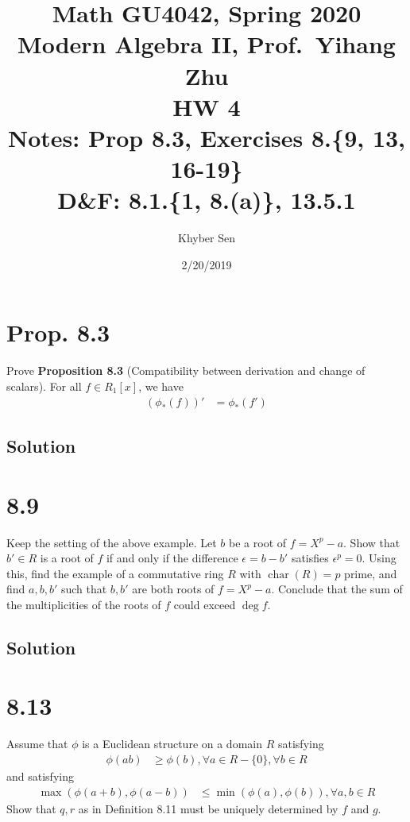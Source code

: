 \documentclass[fleqn]{article}
\title{
Math GU4042, Spring 2020 \\
Modern Algebra II, Prof.\ Yihang Zhu \\
HW 4 \\
Notes: Prop 8.3, Exercises 8.\{9, 13, 16-19\} \\
D\&F: 8.1.\{1, 8.(a)\}, 13.5.1
}
\author{Khyber Sen}
\date{2/20/2019}
\DeclareMathOperator{\Char}{char}
\begin{document}
    
    \maketitle
    
    \section{Prop. 8.3}
    Prove \textbf{Proposition 8.3} (Compatibility between derivation and change of scalars).  For all $f \in R_1[x]$, we have
    \begin{align}
        (\phi_*(f))' &= \phi_*(f')
    \end{align}
        
        \subsection{Solution}
        
    
    \section{8.9}
    Keep the setting of the above example.  Let $b$ be a root of $f = X^p - a$.  Show that $b' \in R$ is a root of $f$ if and only if the difference $\epsilon = b - b'$ satisfies $\epsilon^p = 0$.  Using this, find the example of a commutative ring $R$ with $\Char(R) = p$ prime, and find $a, b, b'$ such that $b, b'$ are both roots of $f = X^p - a$.  Conclude that the sum of the multiplicities of the roots of $f$ could exceed $\deg f$.
        
        \subsection{Solution}
        
    
    \section{8.13}
    Assume that $\phi$ is a Euclidean structure on a domain $R$ satisfying
    \begin{align}
        \phi(ab) &\geq \phi(b), \forall a \in R - \{0\}, \forall b \in R
    \end{align}
    and satisfying
    \begin{align}
        \max(\phi(a + b), \phi(a - b)) &\leq \min(\phi(a), \phi(b)), \forall a, b \in R
    \end{align}
    Show that $q, r$ as in Definition 8.11 must be uniquely determined by $f$ and $g$.
        
\end{document}
